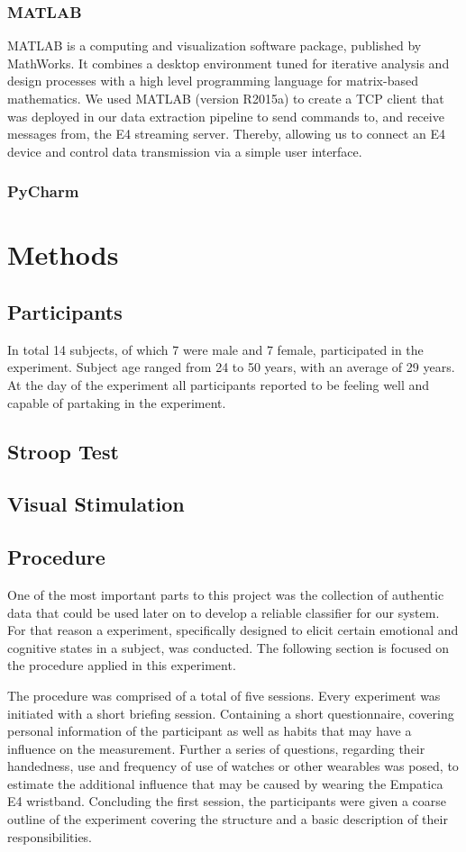 \subsubsection{MATLAB}
MATLAB is a computing and visualization software package, published by MathWorks. It combines a desktop environment tuned for iterative analysis and design processes with a high level programming language for matrix-based mathematics. We used MATLAB (version R2015a) to create a TCP client that was deployed in our data extraction pipeline to send commands to, and receive messages from, the E4 streaming server. Thereby, allowing us to connect an E4 device and control data transmission via a simple user interface.
\subsubsection{PyCharm}


\section{Methods}
\subsection{Participants}
In total 14 subjects, of which 7 were male and 7 female, participated in the experiment. Subject age ranged from 24 to 50 years, with an average of 29 years. At the day of the experiment all participants reported to be feeling well and capable of partaking in the experiment. 
\subsection{Stroop Test}
\subsection{Visual Stimulation}
\subsection{Procedure}
One of the most important parts to this project was the collection of authentic data that could be used later on to develop a reliable classifier for our system. For that reason a experiment, specifically designed to elicit certain emotional and cognitive states in a subject, was conducted. The following section is focused on the procedure applied in this experiment.

The procedure was comprised of a total of five sessions. Every experiment was initiated with a short briefing session. Containing a short questionnaire, covering personal information of the participant as well as habits that may have a influence on the measurement. Further a series of questions, regarding their handedness, use and frequency of use of watches or other wearables was posed, to estimate the additional influence that may be caused by wearing the Empatica E4 wristband.
Concluding the first session, the participants were given a coarse outline of the experiment covering the structure and a basic description of their responsibilities.

